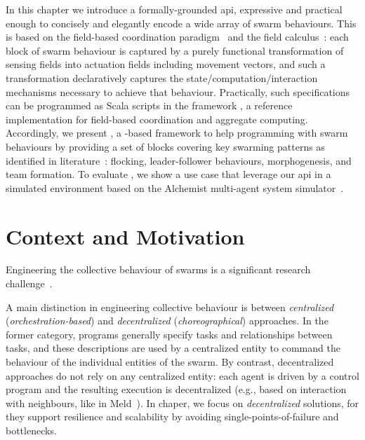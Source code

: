 In this chapter we introduce a formally-grounded \ac{api},
 expressive and practical enough
 to concisely and elegantly encode a wide array of swarm behaviours.
%
This is based on the field-based coordination paradigm~\cite{DBLP:journals/jlap/ViroliBDACP19} and the field calculus~\cite{AVDPB-TOCL2019}:
each block of swarm behaviour is captured by a purely functional transformation of sensing fields into actuation fields including movement vectors,
and such a transformation declaratively captures the state/computation/interaction mechanisms necessary to achieve that behaviour.
%
Practically, such specifications can be programmed as Scala scripts in the \scafi{} framework \cite{DBLP:journals/softx/CasadeiVAP22,ACDV-LMCS2023}, a reference implementation for field-based coordination and aggregate computing.
%
Accordingly, we present \MacroSwarm{}, a \scafi{}-based framework to help programming with swarm behaviours by providing a set of blocks covering key swarming patterns as identified in literature~\cite{DBLP:journals/swarm/BrambillaFBD13}: flocking, leader-follower behaviours, morphogenesis, and team formation.
%
To evaluate \MacroSwarm{}, we show a use case that leverage our \ac{api} 
 in a simulated environment based on the Alchemist multi-agent system simulator~\cite{DBLP:journals/jos/PianiniMV13}.
 
\section{Context and Motivation}
\label{coordination2023-macro:sec:context}

Engineering the collective behaviour of swarms is 
 a significant research challenge~\cite{DBLP:journals/swarm/BrambillaFBD13}.
%
%
%

A main distinction in engineering collective behaviour is between \emph{centralized} (\emph{orchestration-based}) and \emph{decentralized} (\emph{choreographical}) approaches.
%
In the former category,
 programs generally specify tasks and relationships between tasks, %
 and these descriptions are used by a centralized entity
 to command the behaviour of the individual entities of the swarm.
%
By contrast,
 decentralized approaches
 do not rely on any centralized entity:
 each agent is driven by a control program 
 and the resulting execution is decentralized
 (e.g., based on interaction with neighbours, like in Meld~\cite{Meld2007}).
%
In chaper, we focus on \emph{decentralized} solutions, for they support resilience and scalability by avoiding single-points-of-failure and bottlenecks.

